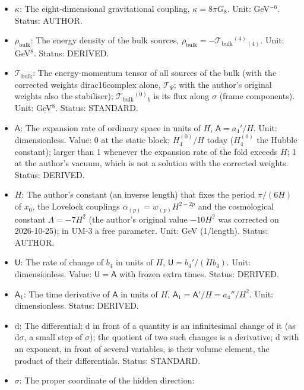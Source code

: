 \documentclass[
  10pt,
]{article}
\providecommand{\tightlist}{%
  \setlength{\itemsep}{0pt}\setlength{\parskip}{0pt}}
\begin{document}
\begin{itemize}
\tightlist
\item
  \(\kappa\): The eight-dimensional gravitational coupling,
  \(\kappa = 8\pi G_8\). Unit: GeV\(^{-6}\). Status: AUTHOR.
\item
  \(\rho_{\mathrm{bulk}}\): The energy density of the bulk sources,
  \(\rho_{\mathrm{bulk}} = -\mathcal{T}_{\mathrm{bulk}}{}^{(4)}{}_{(4)}\).
  Unit: GeV\(^8\). Status: DERIVED.
\item
  \(\mathcal{T}_{\mathrm{bulk}}\): The energy-momentum tensor of all
  sources of the bulk (with the corrected weights dirac16complex alone,
  \(\mathcal{T}_\Psi\); with the author's original weights also the
  stabiliser); \(\mathcal{T}_{\mathrm{bulk}}{}^{(0)}{}_b\) is its flux
  along \(\sigma\) (frame components). Unit: GeV\(^8\). Status:
  STANDARD.
\item
  \(\mathsf{A}\): The expansion rate of ordinary space in units of
  \(H\), \(\mathsf{A} = a_4'/H\). Unit: dimensionless. Value: 0 at the
  static block; \(H_4^{(0)}/H\) today (\(H_4^{(0)}\) the Hubble
  constant); larger than 1 whenever the expansion rate of the fold
  exceeds \(H\); 1 at the author's vacuum, which is not a solution with
  the corrected weights. Status: DERIVED.
\item
  \(H\): The author's constant (an inverse length) that fixes the period
  \(\pi/(6H)\) of \(x_0\), the Lovelock couplings
  \(\alpha_{(p)} = w_{(p)}H^{2-2p}\) and the cosmological constant
  \(\Lambda = -7H^2\) (the author's original value \(-10H^2\) was
  corrected on 2026-10-25); in UM-3 a free parameter. Unit: GeV
  (1/length). Status: AUTHOR.
\item
  \(\mathsf{U}\): The rate of change of \(b_4\) in units of \(H\),
  \(\mathsf{U} = b_4'/(Hb_4)\). Unit: dimensionless. Value:
  \(\mathsf{U} = \mathsf{A}\) with frozen extra times. Status: DERIVED.
\item
  \(\mathsf{A}_1\): The time derivative of \(\mathsf{A}\) in units of
  \(H\), \(\mathsf{A}_1 = \mathsf{A}'/H = a_4''/H^2\). Unit:
  dimensionless. Status: DERIVED.
\item
  \(\mathrm{d}\): The differential: \(\mathrm{d}\) in front of a
  quantity is an infinitesimal change of it (as \(\mathrm{d}\sigma\), a
  small step of \(\sigma\)); the quotient of two such changes is a
  derivative; \(\mathrm{d}\) with an exponent, in front of several
  variables, is their volume element, the product of their
  differentials. Status: STANDARD.
\item
  \(\sigma\): The proper coordinate of the hidden direction:

\end{itemize}
\end{document}
